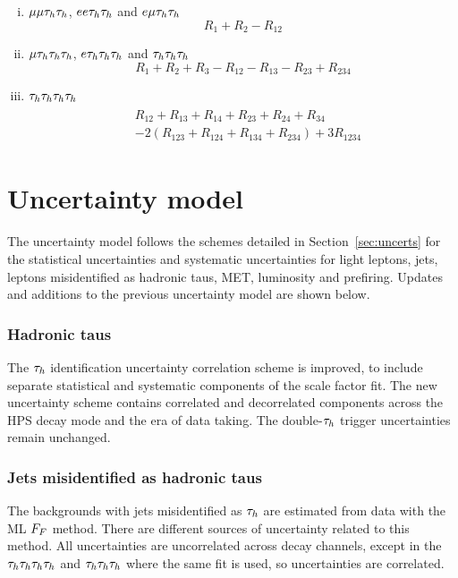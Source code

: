 \begin{enumerate}[i)]
\item $\mu\mu\tau_{h}\tau_{h}$, $ee\tau_{h}\tau_{h}$ and $e\mu\tau_{h}\tau_{h}$
\begin{equation}
R_1 + R_2 - R_{12}
\end{equation}

\item $\mu\tau_{h}\tau_{h}\tau_{h}$, $e\tau_{h}\tau_{h}\tau_{h}$ and $\tau_{h}\tau_{h}\tau_{h}$
\begin{equation}
R_1 + R_2 + R_3 - R_{12} - R_{13} - R_{23} + R_{234}
\end{equation}

\item $\tau_{h}\tau_{h}\tau_{h}\tau_{h}$
\begin{align}
\begin{split}
&R_{12} + R_{13} + R_{14} + R_{23} + R_{24} + R_{34} \\
&- 2(R_{123} + R_{124} + R_{134} + R_{234}) + 3R_{1234}
\end{split}
\end{align}
\end{enumerate}
 
\section{Uncertainty model}

The uncertainty model follows the schemes detailed in Section~\ref{sec:uncerts} for the statistical uncertainties and systematic uncertainties for light leptons, jets, leptons misidentified as hadronic taus, MET, luminosity and prefiring.
Updates and additions to the previous uncertainty model are shown below. \\

\subsubsection{Hadronic taus}
The $\tau_{h}$ identification uncertainty correlation scheme is improved, to include separate statistical and systematic components of the scale factor fit.
The new uncertainty scheme contains correlated and decorrelated components across the \ac{HPS} decay mode and the era of data taking.
The double-$\tau_{h}$ trigger uncertainties remain unchanged. \\

\subsubsection{Jets misidentified as hadronic taus}
The backgrounds with jets misidentified as $\tau_{h}$ are estimated from data with the \ac{ML} $F_{F}$ method. 
There are different sources of uncertainty related to this method. 
All uncertainties are uncorrelated across decay channels, except in the $\tau_{h}\tau_{h}\tau_{h}\tau_{h}$ and $\tau_{h}\tau_{h}\tau_{h}$ where the same fit is used, so uncertainties are correlated. \\

